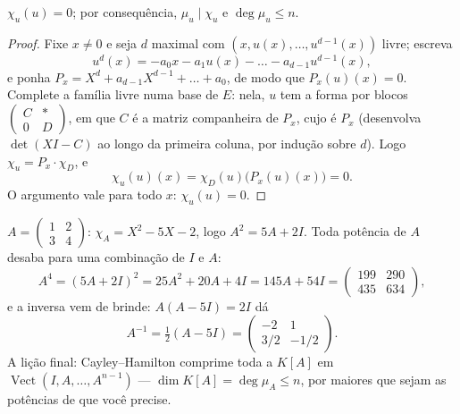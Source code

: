 \begin{theorem}\label{thm:b2:reduction:cayleyhamilton}
$\chi_u(u) = 0$; por consequência, $\mu_u \mid \chi_u$ e $\deg \mu_u
\leq n$.
\end{theorem}

\begin{proof}
Fixe $x \neq 0$ e seja $d$ maximal com $(x, u(x), \dots,
u^{d-1}(x))$ livre; escreva
\[
u^d(x) = -a_0 x - a_1 u(x) - \dots - a_{d-1}u^{d-1}(x),
\]
e ponha $P_x = X^d + a_{d-1}X^{d-1} + \dots + a_0$, de modo que $P_x(u)(x) =
0$. Complete a família livre numa base de $E$: nela, $u$ tem
a forma por blocos $\begin{pmatrix} C & \ast\\ 0 & D\end{pmatrix}$, em que $C$
é a matriz companheira de $P_x$, cujo  é
$P_x$ (desenvolva $\det(XI - C)$ ao longo da primeira coluna, por indução sobre
$d$). Logo $\chi_u = P_x \cdot \chi_D$, e
\[
\chi_u(u)(x) = \chi_D(u)\bigl(P_x(u)(x)\bigr) = 0 .
\]
O argumento vale para todo $x$: $\chi_u(u) = 0$.
\end{proof}

\begin{example}\label{ex:b2:reduction:chwork}
$A = \begin{pmatrix} 1 & 2\\ 3 & 4\end{pmatrix}$: $\chi_A = X^2 -
5X - 2$, logo $A^2 = 5A + 2I$. Toda potência de $A$ desaba para uma
combinação de $I$ e $A$:
\[
A^4 = (5A + 2I)^2 = 25A^2 + 20A + 4I = 145A + 54I =
\begin{pmatrix} 199 & 290\\ 435 & 634\end{pmatrix},
\]
e a inversa vem de brinde: $A(A - 5I) = 2I$ dá
\[
A^{-1} = \tfrac12(A - 5I)
= \begin{pmatrix} -2 & 1\\ 3/2 & -1/2\end{pmatrix}.
\]
A lição final: Cayley--Hamilton comprime toda a 
$K[A]$ em $\operatorname{Vect}(I, A, \dots, A^{n-1})$ ---
$\dim K[A] = \deg\mu_A \leq n$, por maiores que sejam as potências de que você precise.
\end{example}

